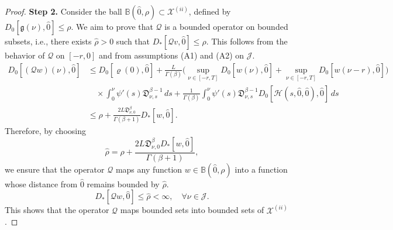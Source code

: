 \documentclass[reqno]{amsart}
\begin{document}
\begin{proof}
\noindent\textbf{Step 2.} 
Consider the ball \( \mathbb{B}(\hat{0}, \rho) \subset \mathcal{X}^{(ii)} \), 
defined by \( D_0[\mathfrak{g}(\nu ), \hat{0}] \leq \rho \). 
We aim to prove that \( \mathcal{Q} \) is a bounded operator on bounded subsets, 
i.e., there exists \( \hat{\rho} > 0 \) such that 
\( D_{*}[\mathcal{Q}v, \hat{0}] \leq \hat{\rho} \). This follows from the behavior of 
\( \mathcal{Q} \) on \( [-r, 0] \) and from assumptions (A1) and (A2) on 
\( \mathcal{J} \).
\begin{align*}
D_0[(\mathcal{Q} w)(\nu ), \hat{0}]
&\leq  D_0[\varrho(0), \hat{0}]
 +\frac{L}{\Gamma(\beta)}\Big(\sup _{\nu \in[- r, T]} D_0[ w(\nu ), \hat{0}]
 +\sup _{\nu \in[- r, T]} D_0[ w(\nu - r), \hat{0}]\Big) \\
&\quad\times \int_0^{\nu } \psi'(s)\mathfrak{D}_{\nu ,s}^{\beta-1}\,ds
 +\frac{1}{\Gamma(\beta)} \int_0^{\nu } \psi'(s)\mathfrak{D}_{\nu ,s}^{\beta-1}
  D_0[\mathcal{H}(s, \hat{0}, \hat{0}), \hat{0}]\,ds \\
&\leq  \rho+ \frac{2L\mathfrak{D}_{\nu ,0}^{\beta}}{\Gamma(\beta+1)} D_{*}[ w, \hat{0}].
\end{align*}
Therefore, by choosing
$$
\hat{\rho} = \rho + \frac{2L\mathfrak{D}_{\nu ,0}^{\beta} D_{*}
[ w, \hat{0}]}{\Gamma(\beta+1)},
$$
we ensure that the operator \( \mathcal{Q} \) maps any function 
\( w \in \mathbb{B}(\hat{0}, \rho) \) into a function whose distance from 
\( \hat{0} \) remains bounded by \( \hat{\rho} \).
$$
D_{*}[\mathcal{Q} w, \hat{0}] \leq \hat{\rho}<\infty, \quad \forall \nu \in\mathcal{J} .
$$
This shows that the operator $\mathcal{Q}$ maps bounded sets into bounded sets of 
$\mathcal{X}^{(ii)}$.
\smallskip


\end{proof}
\end{document}
